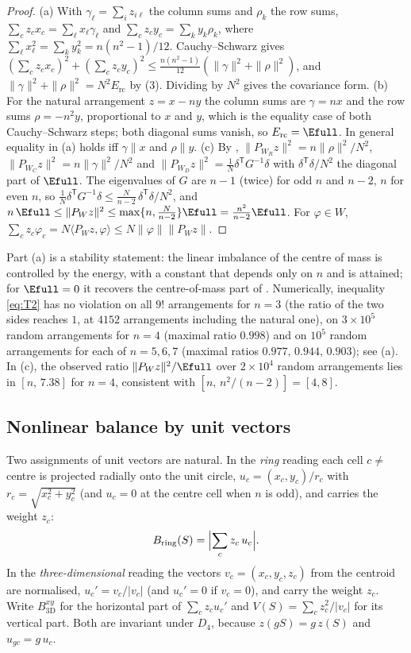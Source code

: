 \begin{proof}
(a) With $\gamma_\ell=\sum_iz_{i\ell}$ the column sums and $\rho_k$ the row sums, $\sum_cz_cx_c=\sum_\ell x_\ell\gamma_\ell$ and $\sum_cz_cy_c=\sum_ky_k\rho_k$, where $\sum_\ell x_\ell^2=\sum_ky_k^2=n(n^2-1)/12$.
Cauchy--Schwarz gives $(\sum_cz_cx_c)^2+(\sum_cz_cy_c)^2\le\frac{n(n^2-1)}{12}(\|\gamma\|^2+\|\rho\|^2)$, and $\|\gamma\|^2+\|\rho\|^2=N^2E_{\mathrm{rc}}$ by (3).
Dividing by $N^2$ gives the covariance form.
(b) For the natural arrangement $z=x-ny$ the column sums are $\gamma=nx$ and the row sums $\rho=-n^2y$, proportional to $x$ and $y$, which is the equality case of both Cauchy--Schwarz steps; both diagonal sums vanish, so $E_{\mathrm{rc}}=\Efull$.
In general equality in (a) holds iff $\gamma\parallel x$ and $\rho\parallel y$.
(c) By , $\|P_{W_R}z\|^2=n\|\rho\|^2/N^2$, $\|P_{W_C}z\|^2=n\|\gamma\|^2/N^2$ and $\|P_{W_D}z\|^2=\frac1N\delta^{\mathsf T}G^{-1}\delta$ with $\delta^{\mathsf T}\delta/N^2$ the diagonal part of $\Efull$.
The eigenvalues of $G$ are $n-1$ (twice) for odd $n$ and $n-2,\,n$ for even $n$, so $\frac1N\delta^{\mathsf T}G^{-1}\delta\le\frac{N}{n-2}\,\delta^{\mathsf T}\delta/N^2$, and
$n\,\Efull\le\|P_Wz\|^2\le\max\{n,\tfrac{N}{n-2}\}\Efull=\tfrac{n^2}{n-2}\Efull$.
For $\varphi\in W$, $\sum_cz_c\varphi_c=N\langle P_Wz,\varphi\rangle\le N\|\varphi\|\|P_Wz\|$.
\end{proof}

Part (a) is a stability statement: the linear imbalance of the centre of mass is controlled by the energy, with a constant that depends only on $n$ and is attained; for $\Efull=0$ it recovers the centre-of-mass part of .
Numerically, inequality \eqref{eq:T2} has no violation on all $9!$ arrangements for $n=3$ (the ratio of the two sides reaches $1$, at $4152$ arrangements including the natural one), on $3\times10^5$ random arrangements for $n=4$ (maximal ratio $0.998$) and on $10^5$ random arrangements for each of $n=5,6,7$ (maximal ratios $0.977,\,0.944,\,0.903$); see (a).
In (c), the observed ratio $\|P_Wz\|^2/\Efull$ over $2\times10^4$ random arrangements lies in $[n,\,7.38]$ for $n=4$, consistent with $[n,\,n^2/(n-2)]=[4,8]$.

\subsection{Nonlinear balance by unit vectors}
\label{sec:balance_unit}

Two assignments of unit vectors are natural.
In the \emph{ring} reading each cell $c\ne$ centre is projected radially onto the unit circle, $u_c=(x_c,y_c)/r_c$ with $r_c=\sqrt{x_c^2+y_c^2}$ (and $u_c=0$ at the centre cell when $n$ is odd), and carries the weight $z_c$:
\[
B_{\mathrm{ring}}(S)=\Bigl|\sum_cz_c\,u_c\Bigr| .
\]
In the \emph{three-dimensional} reading the vectors $v_c=(x_c,y_c,z_c)$ from the centroid are normalised, $u_c'=v_c/|v_c|$ (and $u_c'=0$ if $v_c=0$), and carry the weight $z_c$.
Write $B_{3\mathrm D}^{xy}$ for the horizontal part of $\sum_cz_cu_c'$ and $V(S)=\sum_cz_c^2/|v_c|$ for its vertical part.
Both are invariant under $D_4$, because $z(gS)=g\,z(S)$ and $u_{gc}=g\,u_c$.


